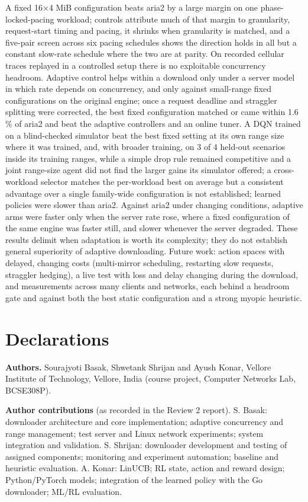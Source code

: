 \documentclass[10pt,a4paper]{article}
\begin{document}
A fixed 16×4 MiB configuration beats aria2 by a large margin on one phase-locked-pacing workload; controls attribute much of that margin to granularity, request-start timing and pacing, it shrinks when granularity is matched, and a five-pair screen across six pacing schedules shows the direction holds in all but a constant slow-rate schedule where the two are at parity. On recorded cellular traces replayed in a controlled setup there is no exploitable concurrency headroom. Adaptive control helps within a download only under a server model in which rate depends on concurrency, and only against small-range fixed configurations on the original engine; once a request deadline and straggler splitting were corrected, the best fixed configuration matched or came within 1.6 \% of aria2 and beat the adaptive controllers and an online tuner. A DQN trained on a blind-checked simulator beat the best fixed setting at its own range size where it was trained, and, with broader training, on 3 of 4 held-out scenarios inside its training ranges, while a simple drop rule remained competitive and a joint range-size agent did not find the larger gains its simulator offered; a cross-workload selector matches the per-workload best on average but a consistent advantage over a single family-wide configuration is not established; learned policies were slower than aria2. Against aria2 under changing conditions, adaptive arms were faster only when the server rate rose, where a fixed configuration of the same engine was faster still, and slower whenever the server degraded. These results delimit when adaptation is worth its complexity; they do not establish general superiority of adaptive downloading. Future work: action spaces with delayed, changing costs (multi-mirror scheduling, restarting slow requests, straggler hedging), a live test with loss and delay changing during the download, and measurements across many clients and networks, each behind a headroom gate and against both the best static configuration and a strong myopic heuristic.


\section*{Declarations}

\textbf{Authors.} Sourajyoti Basak, Shwetank Shrijan and Ayush Konar, Vellore Institute of Technology, Vellore, India (course project, Computer Networks Lab, BCSE308P).


\textbf{Author contributions} (as recorded in the Review 2 report). S. Basak: downloader architecture and core implementation; adaptive concurrency and range management; test server and Linux network experiments; system integration and validation. S. Shrijan: downloader development and testing of assigned components; monitoring and experiment automation; baseline and heuristic evaluation. A. Konar: LinUCB; RL state, action and reward design; Python/PyTorch models; integration of the learned policy with the Go downloader; ML/RL evaluation.
\end{document}
